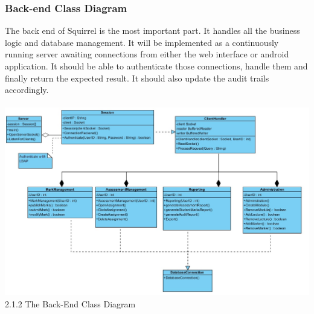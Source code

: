 \documentclass[12pt,a4paper]{article}
\begin{document}
		\subsubsection{Back-end Class Diagram}
		The back end of Squirrel is the most important part. It handles all the business logic and database management. It will be implemented as a continuously running server awaiting connections from either the web interface or android application. It should be able to authenticate those connections, handle them and finally return the expected result. It should also update the audit trails accordingly. \\\\
			\includegraphics[scale=0.55]{./backendClasses.jpg}
			2.1.2 The Back-End Class Diagram\\\\
			\pagebreak
\end{document}
